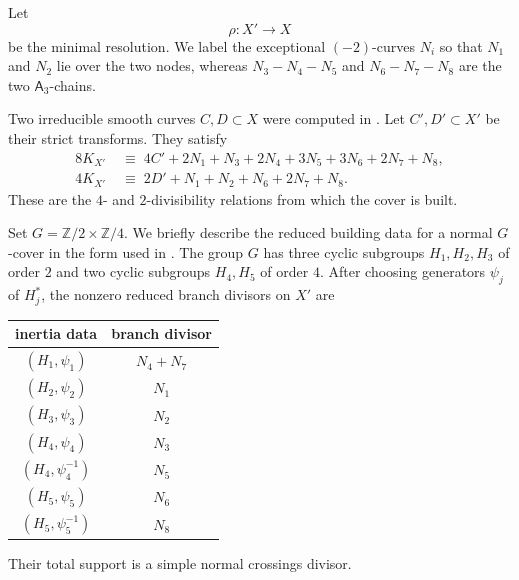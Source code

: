 \documentclass[11pt,a4paper]{article}
\newcommand{\ZZ}{\mathbb Z}
\begin{document}
Let
\[
                         \rho\colon X'\longrightarrow X
\]
be the minimal resolution.
We label the exceptional $(-2)$-curves $N_i$ so that $N_1$
and $N_2$ lie over the two nodes, whereas
$N_3\!\mathbin{-}\!N_4\!\mathbin{-}\!N_5$ and $N_6\!\mathbin{-}\!N_7\!\mathbin{-}\!N_8$
are the two \(\mathsf A_3\)-chains.

Two irreducible smooth curves $C,D\subset X$ were computed in
\cite{RitoExplicitFQ}.  Let $C',D'\subset X'$ be their strict transforms.
They satisfy
\begin{align}
  8K_{X'} \;&\equiv\;
     4C'+2N_1+N_3+2N_4+3N_5+3N_6+2N_7+N_8,
       \label{eq:four-divisibility}\\
  4K_{X'} \;&\equiv\;
     2D'+N_1+N_2+N_6+2N_7+N_8.
       \label{eq:two-divisibility}
\end{align}
These are the $4$- and $2$-divisibility relations from which the cover is
built.


Set $G=\ZZ/2\times\ZZ/4$.
We briefly describe the reduced building data for a normal $G$-cover in the
form used in \cite{Pardini91}.  The group $G$ has three cyclic subgroups
$H_1,H_2,H_3$ of order $2$ and two cyclic subgroups $H_4,H_5$ of order $4$.
After choosing generators $\psi_j$ of $H_j^*$, the nonzero reduced branch
divisors on $X'$ are
\begin{center}
\begin{tabular}{cc}
\toprule
inertia data & branch divisor\\
\midrule
$(H_1,\psi_1)$       & $N_4+N_7$\\
$(H_2,\psi_2)$       & $N_1$\\
$(H_3,\psi_3)$       & $N_2$\\
$(H_4,\psi_4)$       & $N_3$\\
$(H_4,\psi_4^{-1})$  & $N_5$\\
$(H_5,\psi_5)$       & $N_6$\\
$(H_5,\psi_5^{-1})$  & $N_8$\\
\bottomrule
\end{tabular}
\end{center}
Their total support is a simple normal crossings divisor.
\end{document}
